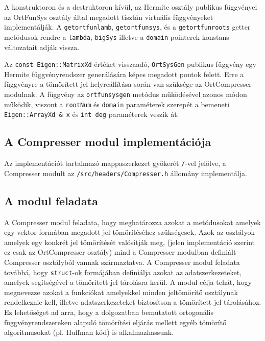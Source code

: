 \documentclass[oneside,titlepage,12pt,a4paper]{report}
\begin{document}
\par A konstruktoron és a destruktoron kívül, az Hermite osztály publikus függvényei az OrtFunSys osztály által megadott tisztán virtuális függvényeket implementálják. A \texttt{getortfunlamb}, \texttt{getortfunsys}, és a \texttt{getortfunroots} getter metódusok rendre a \texttt{lambda}, \texttt{bigSys} illetve a \texttt{domain} pointerek konstans változatait adják vissza. 
\par Az \texttt{const Eigen::MatrixXd} értéket visszaadó, \texttt{OrtSysGen} publikus függvény egy Hermite függvényrendszer generálására képes megadott pontok felett. Erre a függvényre a tömörített jel helyreállítása során van szüksége az OrtCompresser modulnak. A függvény az \texttt{ortfunsysgen} metódus működésével azonos módon működik, viszont a \texttt{rootNum} és \texttt{domain} paraméterek szerepét a bemeneti \texttt{Eigen::ArrayXd \& x} és \texttt{int deg} paraméterek veszik át.   

\subsection{A Compresser modul implementációja} \label{subsec::compr}

Az implementációt tartalmazó mappaszerkezet gyökerét \texttt{/}-vel jelölve, a Compresser modult  az \texttt{/src/headers/Compresser.h} állomány implementálja.

\subsection*{A modul feladata}

\par A Compresser modul feladata, hogy meghatározza azokat a metódusokat amelyek egy vektor formában megadott jel tömörítéséhez szükségesek. Azok az osztályok amelyek egy konkrét jel tömörítését valósítják meg, (jelen implementáció szerint ez csak az OrtCompresser osztály) mind a Compresser modulban definiált Compresser osztályból vannak származtatva. A Compresser modul feladata továbbá, hogy \texttt{struct}-ok formájában definiálja azokat az adatszerkezeteket, amelyek segítségével a tömörített jel tárolásra kerül. A modul célja tehát, hogy megnevezze azokat a funkciókat amelyekkel minden jeltömörítő osztálynak rendelkeznie kell, illetve adatszerkezeteket biztosítson a tömörített jel tárolásához. Ez lehetőséget ad arra, hogy a dolgozatban bemutatott ortogonális függvényrendszereken alapuló tömörítési eljárás mellett egyéb tömörítő algoritmusokat (pl. Huffman kód) is alkalmazhassunk.  
\end{document}
